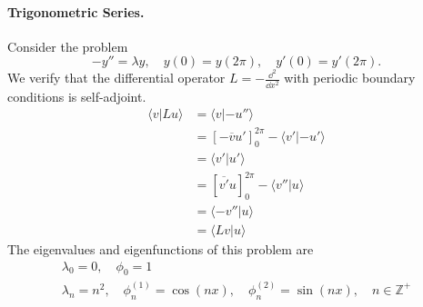 \paragraph{Trigonometric Series.}
Consider the problem 
\[
-y'' = \lambda y, \quad y(0) = y(2 \pi), \quad y'(0) = y'(2 \pi).
\]
We verify that the differential operator $L = - \frac{\dd^2}{\dd x^2}$ with periodic
boundary conditions is self-adjoint.
\begin{align*}
  \langle v | L u \rangle
  &= \langle v | -u'' \rangle \\
  &= \left[ - \overline{v} u' \right]_0^{2\pi} - \langle v' | -u' \rangle \\
  &= \langle v' | u' \rangle \\
  &= \left[ \overline{v'} u \right]_0^{2\pi} - \langle v'' | u \rangle \\
  &= \langle -v'' | u \rangle \\
  &= \langle L v | u \rangle 
\end{align*}
The eigenvalues and eigenfunctions of this problem are
\begin{gather*}
  \lambda_0 = 0, \quad \phi_0 = 1 \\
  \lambda_n = n^2, \quad \phi_n^{(1)} = \cos(n x), 
  \quad \phi_n^{(2)} = \sin(n x), \quad n \in \mathbb{Z}^+
\end{gather*}






























